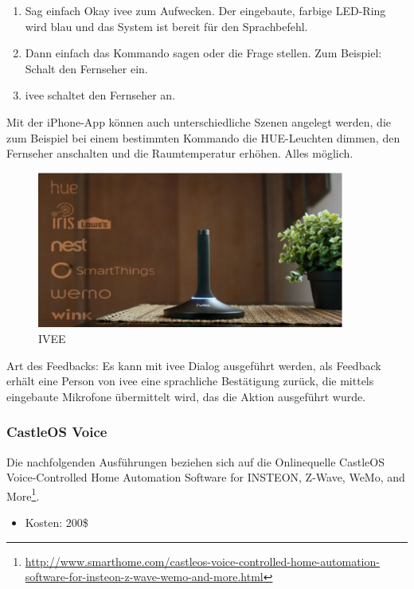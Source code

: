 \begin{enumerate}
\item Sag einfach \glqq Okay ivee\grqq{} zum Aufwecken. Der eingebaute, farbige LED-Ring wird blau und das System ist bereit für den Sprachbefehl.
\item Dann einfach das Kommando sagen oder die Frage stellen. Zum Beispiel: \glqq Schalt den Fernseher ein\grqq .
\item ivee schaltet den Fernseher an.\\
\end{enumerate}

Mit der iPhone-App können auch unterschiedliche Szenen angelegt werden, die zum Beispiel bei einem bestimmten Kommando die HUE-Leuchten dimmen, den Fernseher anschalten und die Raumtemperatur erhöhen. Alles möglich.

\begin{figure}[h!]
	\centering
	\includegraphics[width=0.9\textwidth]{img/Feedback-Mechanismen/IVEE.png}
	\caption{IVEE}
	\label{fig:feedbackIVEE}
\end{figure}

Art des Feedbacks: Es kann mit ivee Dialog ausgeführt werden, als Feedback erhält eine Person von ivee eine sprachliche Bestätigung zurück, die mittels eingebaute Mikrofone übermittelt wird, das die Aktion ausgeführt wurde.

\subsubsection{CastleOS Voice}
Die nachfolgenden Ausführungen beziehen sich auf die Onlinequelle \glqq CastleOS Voice-Controlled Home Automation Software for INSTEON, Z-Wave, WeMo, and More\grqq\footnote{\url{http://www.smarthome.com/castleos-voice-controlled-home-automation-software-for-insteon-z-wave-wemo-and-more.html}}.

\begin{itemize}
\item Kosten: 200\$
\end{itemize}

